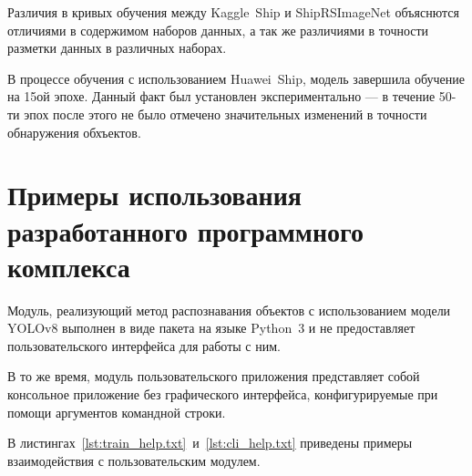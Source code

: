 Различия в кривых обучения между Kaggle~Ship и ShipRSImageNet объяснются отличиями в содержимом наборов данных, а так же различиями в точности разметки данных в различных наборах.

В процессе обучения с использованием Huawei~Ship, модель завершила обучение на 15ой эпохе. Данный факт был установлен экспериментально --- в течение 50-ти эпох после этого не было отмечено значительных изменений в точности обнаружения обхъектов.

\section{Примеры использования разработанного программного комплекса}

Модуль, реализующий метод распознавания объектов с использованием модели YOLOv8 выполнен в виде пакета на языке Python~3 и не предоставляет пользовательского интерфейса для работы с ним.

В то же время, модуль пользовательского приложения представляет собой  консольное приложение без графического интерфейса, конфигурируемые при помощи аргументов командной строки.

В листингах~\ref{lst:train_help.txt}~и~\ref{lst:cli_help.txt} приведены примеры взаимодействия с пользовательским модулем.


